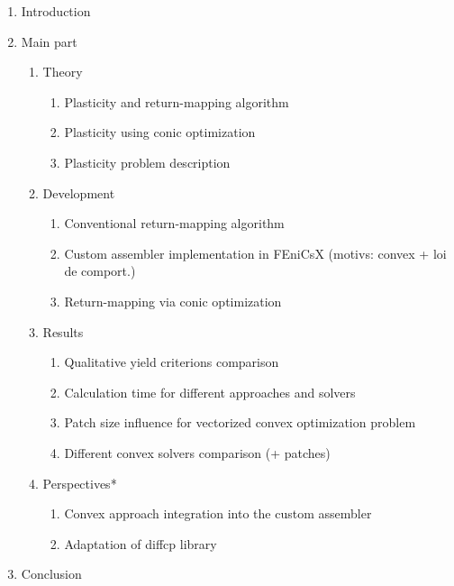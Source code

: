\documentclass[12pt]{article}
\begin{document}
\begin{enumerate}
    \item Introduction
    \item Main part
    \begin{enumerate}
        \item Theory
        \begin{enumerate}
            \item Plasticity and return-mapping algorithm
            \item Plasticity using conic optimization
            \item Plasticity problem description
        \end{enumerate}
        \item Development
        \begin{enumerate}
            \item Conventional return-mapping algorithm
            \item Custom assembler implementation in FEniCsX (motivs: convex + loi de comport.)
            \item Return-mapping via conic optimization
        \end{enumerate} 
        \item Results
        \begin{enumerate}
            \item Qualitative yield criterions comparison
            \item Calculation time for different approaches and solvers
            \item Patch size influence for vectorized convex optimization problem
            \item Different convex solvers comparison (+ patches)
        \end{enumerate}
        \item Perspectives*
        \begin{enumerate}
            \item Convex approach integration into the custom assembler
            \item Adaptation of diffcp library
        \end{enumerate}
    \end{enumerate}
    \item Conclusion
\end{enumerate}
\end{document}
